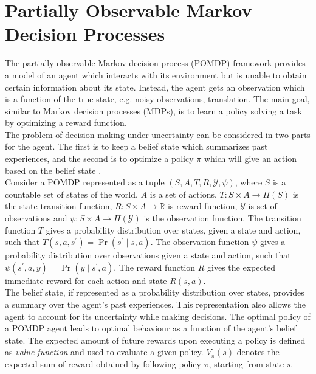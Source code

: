 \section{Partially Observable Markov Decision Processes}
\label{sec:belief_POMDP}
The partially observable Markov decision process (POMDP) framework provides a model of an agent which interacts with its environment but is unable to obtain certain information about its state. Instead, the agent gets an observation which is a function of the true state, e.g. noisy observations, translation. The main goal, similar to Markov decision processes (MDPs), is to learn a policy solving a task by optimizing a reward function. \\
The problem of decision making under uncertainty can be considered in two parts for the agent. The first is to keep a belief state which summarizes past experiences, and the second is to optimize a policy $ \pi $ which will give an action based on the belief state \cite{KAELBLING199899,Murphy2000}.\\
Consider a POMDP represented as a tuple $ (S, A, T, R, \mathcal{Y}, \psi) $, where $ S $ is a countable set of states of the world, $ A $ is a set of actions, $ T: S \times A \rightarrow \varPi(S) $ is the state-transition function, $ R: S\times A \rightarrow \mathbb{R} $ is reward function, $ \mathcal{Y} $ is set of observations and $ \psi:S\times A \rightarrow \varPi(\mathcal{Y})$ is the observation function. The transition function $ T $ gives a probability distribution over states, given a state and action, such that $ T(s, a, s^\prime) = \operatorname{Pr}(s^\prime \mid s, a) $. The observation function $ \psi $ gives a probability distribution over observations given a state and action, such that $ \psi(s^\prime, a, y) = \operatorname{Pr}(y \mid s^\prime, a) $. The reward function $ R $ gives the expected immediate reward for each action and state $ R(s,a) $.\\
The belief state, if represented as a probability distribution over states, provides a summary over the agent's past experiences. This representation also allows the agent to account for its uncertainty while making decisions. The optimal policy of a POMDP agent leads to optimal behaviour as a function of the agent's belief state. %
The expected amount of future rewards upon executing a policy is defined as \textit{value function} and used to evaluate a given policy. $ V_\pi(s) $ denotes the expected sum of reward obtained by following policy $ \pi $, starting from state $ s $.\\
